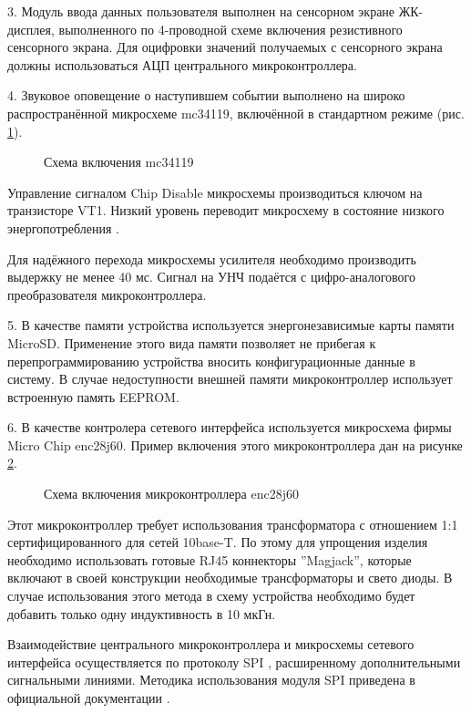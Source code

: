 \begin{par}
	3.	Модуль ввода данных пользователя выполнен на сенсорном экране ЖК-дисплея,
	выполненного по 4-проводной схеме включения резистивного сенсорного экрана. Для
	оцифровки значений получаемых с сенсорного экрана должны использоваться АЦП\cite{avradc} центрального
	микроконтроллера.
\end{par}
	
\begin{par}
	4.	Звуковое оповещение о наступившем событии выполнено на широко распространённой
	микросхеме mc34119, включённой в стандартном режиме (рис. \ref{img:mc34119m}).
	\begin{figure}[ht]
		\caption{Схема включения mc34119}
		\label{img:mc34119m}
	\end{figure}
	Управление сигналом Chip Disable микросхемы производиться ключом на транзисторе VT1. Низкий уровень
	переводит микросхему в состояние низкого энергопотребления \cite{mc34119}.
	
	Для надёжного перехода микросхемы усилителя необходимо производить выдержку не менее 40 мс.
	Сигнал на УНЧ подаётся с цифро-аналогового преобразователя микроконтроллера.
\end{par}

\begin{par}
 	5.	В качестве памяти устройства используется энергонезависимые карты памяти MicroSD.
	Применение этого вида памяти позволяет не прибегая к перепрограммированию устройства
	вносить конфигурационные данные в систему. В случае недоступности внешней памяти микроконтроллер использует
	встроенную память EEPROM.
\end{par}

\begin{par}
 	6.	В качестве контролера сетевого интерфейса используется микросхема фирмы Micro Chip
	enc28j60. Пример включения этого микроконтроллера дан на рисунке \ref{img:ienc28j60}.
	\begin{figure}[ht]
		\caption{Схема включения микроконтроллера enc28j60}
		\label{img:ienc28j60}
	\end{figure}
	
	Этот микроконтроллер требует использования трансформатора с отношением 1:1 сертифицированного
	для сетей 10base-T. По этому для упрощения изделия необходимо использовать готовые RJ45
	коннекторы ''Magjack'', которые включают в своей конструкции необходимые трансформаторы и
	свето диоды. В случае использования этого метода в схему устройства необходимо будет добавить
	только одну индуктивность в 10 мкГн.
	
	Взаимодействие центрального микроконтроллера и микросхемы сетевого интерфейса осуществляется
	по протоколу SPI \cite{enc28j60}, расширенному дополнительными сигнальными линиями. Методика
	использования модуля SPI приведена в официальной документации \cite{avrspi}.
\end{par}


